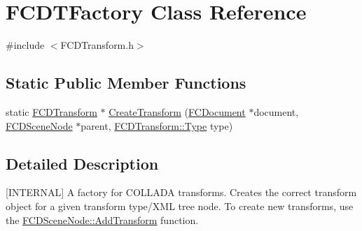 \hypertarget{classFCDTFactory}{
\section{FCDTFactory Class Reference}
\label{classFCDTFactory}
}


{\ttfamily \#include $<$FCDTransform.h$>$}

\subsection*{Static Public Member Functions}
\begin{DoxyCompactItemize}
\item 
static \hyperlink{classFCDTransform}{FCDTransform} $\ast$ \hyperlink{classFCDTFactory_ab1725d09d03056146e8eda137db32fa8}{CreateTransform} (\hyperlink{classFCDocument}{FCDocument} $\ast$document, \hyperlink{classFCDSceneNode}{FCDSceneNode} $\ast$parent, \hyperlink{classFCDTransform_a13e561c5e53aeaf84dedf4661cdc8921}{FCDTransform::Type} type)
\end{DoxyCompactItemize}


\subsection{Detailed Description}
\mbox{[}INTERNAL\mbox{]} A factory for COLLADA transforms. Creates the correct transform object for a given transform type/XML tree node. To create new transforms, use the \hyperlink{classFCDSceneNode_a863250572e5a4dbf022192c653222d94}{FCDSceneNode::AddTransform} function. 

